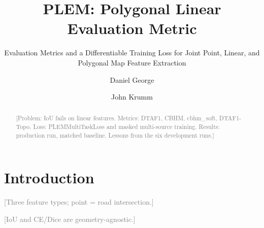 \documentclass[sigconf]{acmart}
\newcommand{\tbd}[1]{\textcolor{gray}{[#1]}}
\begin{document}
\title{PLEM: Polygonal Linear Evaluation Metric}
\subtitle{Evaluation Metrics and a Differentiable Training Loss for Joint Point, Linear, and Polygonal Map Feature Extraction}

\author{Daniel George}

\author{John Krumm}

\begin{abstract}
\tbd{Problem: IoU fails on linear features. Metrics: DTAF1, CBHM, cbhm\_soft, DTAF1-Topo.
Loss: PLEMMultiTaskLoss and masked multi-source training. Results: production run, matched
baseline. Lessons from the six development runs.}
\end{abstract}


\maketitle

\section{Introduction}
\label{sec:intro}

\tbd{Three feature types; point = road intersection.}

\tbd{IoU and CE/Dice are geometry-agnostic.}

\begin{table}
  \caption{IoU and DTAF1 failure modes for linear and polygonal features.}
  \label{tab:failure-modes}
\end{table}
\end{document}
